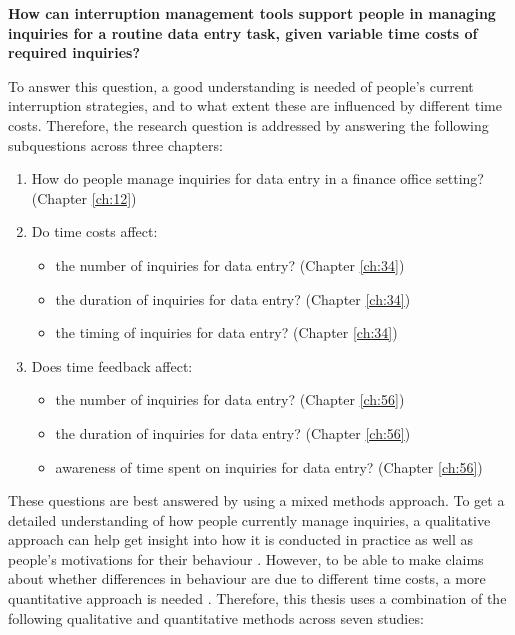 \textbf{How can interruption management tools support people in managing inquiries for a routine data entry task, given variable time costs of required inquiries?}

To answer this question, a good understanding is needed of people's current interruption strategies, and to what extent these are influenced by different time costs. Therefore, the research question is addressed by answering the following subquestions across three chapters:

\begin{enumerate}
\item How do people manage inquiries for data entry in a finance office setting? (Chapter \ref{ch:12})
\item Do time costs affect:
\begin{itemize}
\item the number of inquiries for data entry? (Chapter \ref{ch:34})
\item the duration of inquiries for data entry? (Chapter \ref{ch:34})
\item the timing of inquiries for data entry?  (Chapter \ref{ch:34})
\end{itemize}
\item Does time feedback affect:
\begin{itemize}
\item the number of inquiries for data entry? (Chapter \ref{ch:56})
\item the duration of inquiries for data entry? (Chapter \ref{ch:56})
\item awareness of time spent on inquiries for data entry? (Chapter \ref{ch:56})
\end{itemize}
\end{enumerate}

These questions are best answered by using a mixed methods approach. To get a detailed understanding of how people currently manage inquiries, a qualitative approach can help get insight into how it is conducted in practice as well as people's motivations for their behaviour \citep{Blandford2016}. However, to be able to make claims about whether differences in behaviour are due to different time costs, a more quantitative approach is needed \citep{Cairns2008}.  
Therefore, this thesis uses a combination of the following qualitative and quantitative methods across seven studies:

